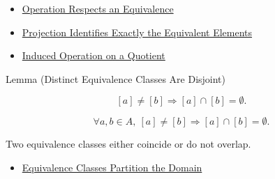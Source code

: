\begin{dependencies}
\begin{itemize}
  \item \hyperref[def:operation-respects-equivalence]{Operation Respects an Equivalence}
  \item \hyperref[prop:projection-identifies-equivalent-elements]{Projection Identifies Exactly the Equivalent Elements}
  \item \hyperref[thm:induced-operation-on-quotient]{Induced Operation on a Quotient}
\end{itemize}
\end{dependencies}

\begin{lemmabox}{Lemma (Distinct Equivalence Classes Are Disjoint)}
\begin{lemma}
\label{lem:distinct-equivalence-classes-are-disjoint}
\[
[a]\ne[b] \Longrightarrow [a]\cap[b]=\emptyset.
\]
\end{lemma}
\end{lemmabox}

\begin{remark*}
\[
\forall a,b\in A,\ [a]\ne[b] \Longrightarrow [a]\cap[b]=\emptyset.
\]
\end{remark*}

\begin{remark*}[Interpretation]
Two equivalence classes either coincide or do not overlap.
\end{remark*}

\begin{dependencies}
\begin{itemize}
  \item \hyperref[thm:equivalence-classes-partition-domain]{Equivalence Classes Partition the Domain}
\end{itemize}
\end{dependencies}
